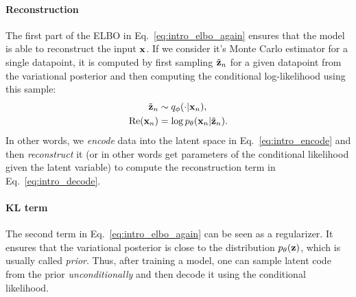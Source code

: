 \paragraph{Reconstruction}
The first part of the ELBO in Eq.~\ref{eq:intro_elbo_again} ensures that the model is able to reconstruct the input ${\mathbf{x}}$. If we consider it's Monte Carlo estimator for a single datapoint, it is computed by first sampling $\tilde{{\mathbf{z}}}_n$ for a given datapoint from the variational posterior
and then computing the conditional log-likelihood using this sample:
\begin{align}
    \tilde{\rvz}_n &\sim q_{\phi}(\cdot|\rvx_n), \label{eq:intro_encode}\\
    \text{Re}(\rvx_n) &= \log p_{\theta}(\rvx_n|\tilde{\rvz}_n).\label{eq:intro_decode}
\end{align}
In other words, we \textit{encode} data into the latent space in Eq.~\ref{eq:intro_encode} and then \textit{reconstruct} it (or in other words get parameters of the conditional likelihood given the latent variable) to compute the reconstruction term in Eq.~\ref{eq:intro_decode}.

\paragraph{KL term}
The second term in Eq.~\ref{eq:intro_elbo_again} can be seen as a regularizer. It ensures that the variational posterior is close to the distribution $p_{\theta}({\mathbf{z}})$, which is usually called \textit{prior}.
Thus, after training a model, one can sample latent code from the prior \textit{unconditionally} and then decode it using the conditional likelihood. 

